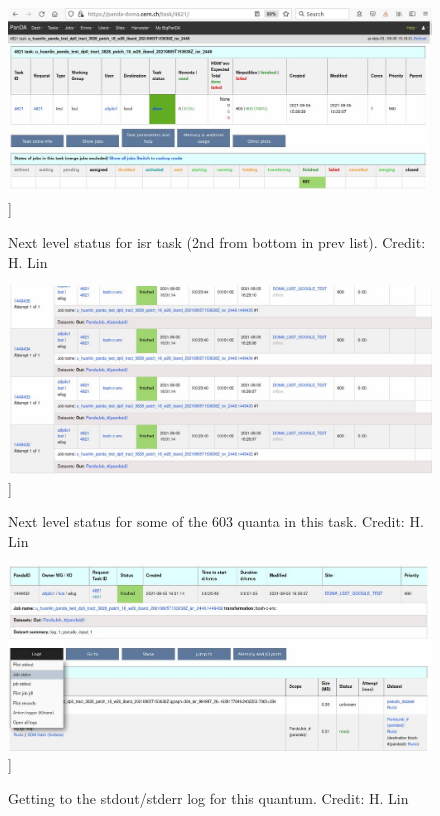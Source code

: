 \documentclass[DM,authoryear,toc]{lsstdoc}
\begin{document}
\begin{figure}
\includegraphics[width=\textwidth]{tasks4.jpg}]
\caption{Next level status for isr task (2nd from bottom in prev list).
Credit: H. Lin}
\end{figure}

\begin{figure}
\includegraphics[width=\textwidth]{tasks5.jpg}]
\caption{Next level status for some of the 603 quanta in this task.
Credit: H. Lin}
\end{figure}

\begin{figure}
\includegraphics[width=\textwidth]{log0.jpg}]
\caption{Getting to the stdout/stderr log for this quantum. 
Credit: H. Lin}
\end{figure}
\end{document}
